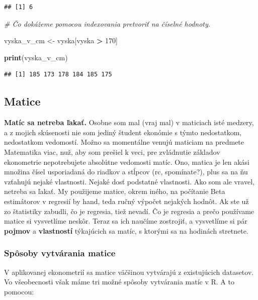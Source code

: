\documentclass[]{article}
\newenvironment{Shaded}{\begin{snugshade}}{\end{snugshade}}
\newcommand{\CommentTok}[1]{\textcolor[rgb]{0.56,0.35,0.01}{\textit{#1}}}
\newcommand{\DecValTok}[1]{\textcolor[rgb]{0.00,0.00,0.81}{#1}}
\newcommand{\KeywordTok}[1]{\textcolor[rgb]{0.13,0.29,0.53}{\textbf{#1}}}
\newcommand{\NormalTok}[1]{#1}
\newcommand{\OperatorTok}[1]{\textcolor[rgb]{0.81,0.36,0.00}{\textbf{#1}}}
\newcommand{\StringTok}[1]{\textcolor[rgb]{0.31,0.60,0.02}{#1}}
\begin{document}
\begin{verbatim}
## [1] 6
\end{verbatim}

\begin{Shaded}
\begin{Highlighting}[]
\CommentTok{# Čo dokážeme pomocou indexovania pretvoriť na číselné hodnoty.}

\NormalTok{vyska_v_cm <-}\StringTok{ }\NormalTok{vyska[vyska }\OperatorTok{>}\StringTok{ }\DecValTok{170}\NormalTok{]}

\KeywordTok{print}\NormalTok{(vyska_v_cm)}
\end{Highlighting}
\end{Shaded}

\begin{verbatim}
## [1] 185 173 178 184 185 175
\end{verbatim}

\hypertarget{matice}{%
\subsection{Matice}\label{matice}}

\textbf{Matíc sa netreba ľakať.} Osobne som mal (vraj mal) v maticiach
isté medzery, a z mojich skúsenosti nie som jediný študent ekonómie s
týmto nedostatkom, nedostatkom vedomostí. Možno sa momentálne venujú
maticiam na predmete Matematika viac, nuž, aby som prešiel k veci, pre
zvládnutie základov ekonometrie nepotrebujete absolútne vedomosti matíc.
Ono, matica je len akási množina čísel usporiadaná do riadkov a stĺpcov
(rc, spomínate?), plus sa na ňu vzťahujú nejaké vlastnosti. Nejaké dosť
podstatné vlastnosti. Ako som ale vravel, netreba sa ľakať. My použijeme
matice, okrem iného, na počítanie Beta estimátorov v regresií by hand,
teda ručný výpočet nejakých hodnôt. Ak ste už zo štatistiky zabudli, čo
je regresia, tiež nevadí. Čo je regresia a prečo používame matice si
vysvetlíme neskôr. Teraz sa ich naučíme zostrojiť, a vysvetlíme si pár
\textbf{pojmov} a \textbf{vlastností} týkajúcich sa matíc, s ktorými sa
na hodinách stretnete.

\hypertarget{spuxf4soby-vytvuxe1rania-matice}{%
\subsubsection{Spôsoby vytvárania
matice}\label{spuxf4soby-vytvuxe1rania-matice}}

V aplikovanej ekonometrií sa matice väčšinou vytvárajú z existujúcich
datasetov. Vo všeobecnosti však máme tri možné spôsoby vytvárania matíc
v R. A to pomocou:
\end{document}
